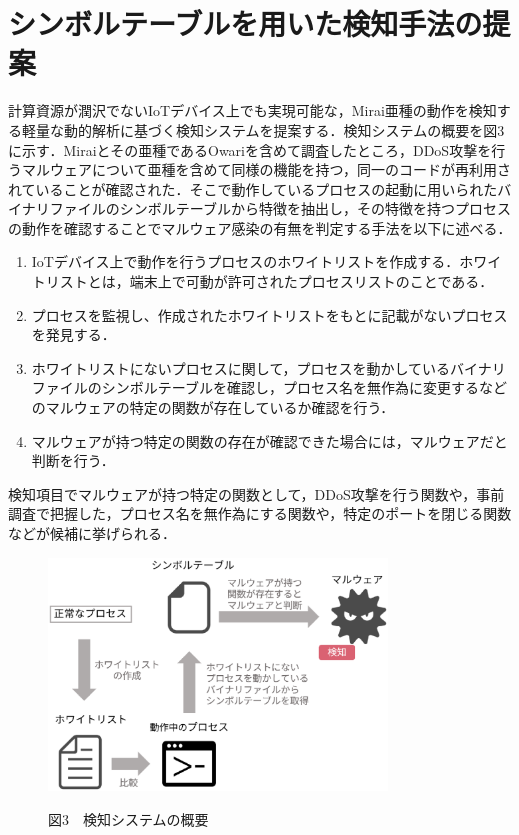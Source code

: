 \section{シンボルテーブルを用いた検知手法の提案}
計算資源が潤沢でないIoTデバイス上でも実現可能な，Mirai亜種の動作を検知する軽量な動的解析に基づく検知システムを提案する．検知システムの概要を図3に示す．Miraiとその亜種であるOwariを含めて調査したところ，DDoS攻撃を行うマルウェアについて亜種を含めて同様の機能を持つ，同一のコードが再利用されていることが確認された．そこで動作しているプロセスの起動に用いられたバイナリファイルのシンボルテーブルから特徴を抽出し，その特徴を持つプロセスの動作を確認することでマルウェア感染の有無を判定する手法を以下に述べる．

\begin{enumerate}
 \item IoTデバイス上で動作を行うプロセスのホワイトリストを作成する．ホワイトリストとは，端末上で可動が許可されたプロセスリストのことである．
 \item プロセスを監視し、作成されたホワイトリストをもとに記載がないプロセスを発見する．
 \item ホワイトリストにないプロセスに関して，プロセスを動かしているバイナリファイルのシンボルテーブルを確認し，プロセス名を無作為に変更するなどのマルウェアの特定の関数が存在しているか確認を行う．
 \item マルウェアが持つ特定の関数の存在が確認できた場合には，マルウェアだと判断を行う．
 \end{enumerate}
 検知項目でマルウェアが持つ特定の関数として，DDoS攻撃を行う関数や，事前調査で把握した，プロセス名を無作為にする関数や，特定のポートを閉じる関数などが候補に挙げられる．
 
 \begin{figure}[h]
 \centering
    \includegraphics[width=90mm]{figures/system.eps}
 \label{fig:model}
 \begin{center}図3　検知システムの概要\end{center}
 \end{figure}
 

